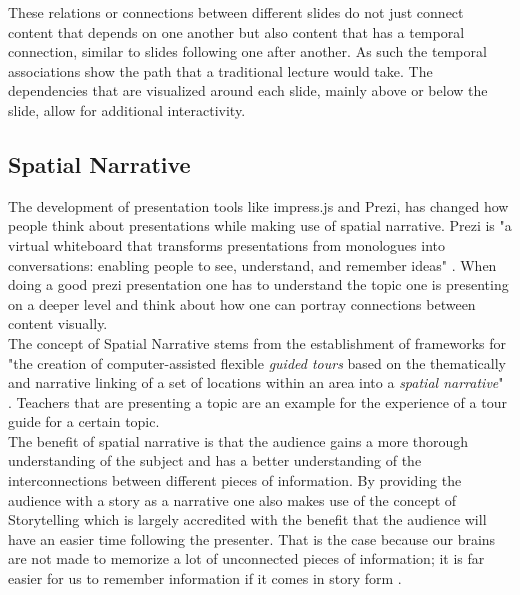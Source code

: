 \documentclass[twoside, 12pt]{article}
\begin{document}
These relations or connections between different slides do not just connect content that depends on one another but also content that has a temporal connection, similar to slides following one after another. As such the temporal associations show the path that a traditional lecture would take. The dependencies that are visualized around each slide, mainly above or below the slide, allow for additional interactivity.

\subsection{Spatial Narrative}
\label{sec:spatialnarrative}

The development of presentation tools like impress.js and Prezi, has changed how people think about presentations while making use of spatial narrative. Prezi is "a virtual whiteboard that transforms presentations from monologues into conversations: enabling people to see, understand, and remember ideas" \cite{Prezi:npentrel14}. When doing a good prezi presentation one has to understand the topic one is presenting on a deeper level and think about how one can portray connections between content visually.\\

The concept of Spatial Narrative stems from the establishment of frameworks for "the creation of computer-assisted flexible \textit{guided tours} based on the thematically and narrative linking of a set of locations within an area into a \textit{spatial narrative}" \cite{SpatialNarratives:npentrel14}. Teachers that are presenting a topic are an example for the experience of a tour guide for a certain topic.\\

The benefit of spatial narrative is that the audience gains a more thorough understanding of the subject and has a better understanding of the interconnections between different pieces of information. By providing the audience with a story as a narrative one also makes use of the concept of Storytelling which is largely accredited with the benefit that the audience will have an easier time following the presenter. That is the case because our brains are not made to memorize a lot of unconnected pieces of information; it is far easier for us to remember information if it comes in story form \cite{Storytelling:npentrel14}.\\
\end{document}
